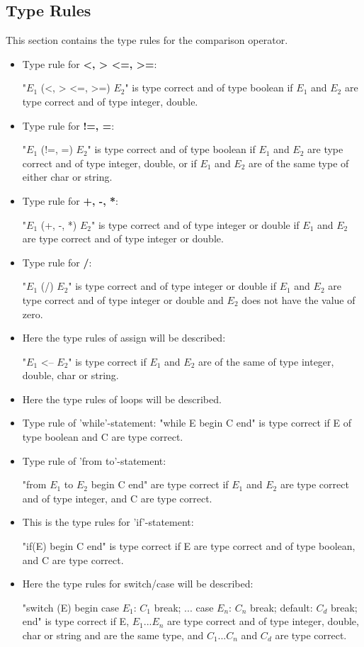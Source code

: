 \subsection{Type Rules} %
This section contains the type rules for the comparison operator.
\begin{itemize}

\item Type rule for \textbf{<, > <=, >=}:

"$E_1$ (<, > <=, >=) $E_2$" is type correct and of type boolean if $E_1$ and $E_2$ are type correct and of type integer, double.

\item Type rule for \textbf{!=, =}:

"$E_1$ (!=, =) $E_2$" is type correct and of type boolean if $E_1$ and $E_2$ are type correct and of type integer, double, or if $E_1$ and $E_2$ are of the same type of either char or string.

\item Type rule for \textbf{+, -, *}:

"$E_1$ (+, -, *) $E_2$" is type correct and of type integer or double if $E_1$ and $E_2$ are type correct and of type integer or double.

\item Type rule for \textbf{/}:

"$E_1$ (/) $E_2$" is type correct and of type integer or double if $E_1$ and $E_2$ are type correct and of type integer or double and $E_2$ does not have the value of zero.

\item Here the type rules of assign will be described:

"$E_1$ <-- $E_2$" is type correct if $E_1$ and $E_2$ are of the same of type integer, double, char or string.

\item Here the type rules of loops will be described.

\item Type rule of 'while'-statement: 
"while E begin C end" is type correct if E of type boolean and C are type correct.

\item Type rule of 'from to'-statement: 

"from $E_1$ to $E_2$ begin C end" are type correct if $E_1$ and $E_2$ are type correct and of type integer, and C are type correct.

\item This is the type rules for 'if'-statement:

"if(E) begin C end" is type correct if E are type correct and of type boolean, and C are type correct.

\item Here the type rules for switch/case will be described:

"switch (E) begin case $E_1$: $C_1$ break; ... case $E_n$: $C_n$ break; default: $C_d$ break; end" is type correct if E, $E_1$...$E_n$ are type correct and of type integer, double, char or string and are the same type, and $C_1$...$C_n$ and $C_d$ are type correct.
\end{itemize}